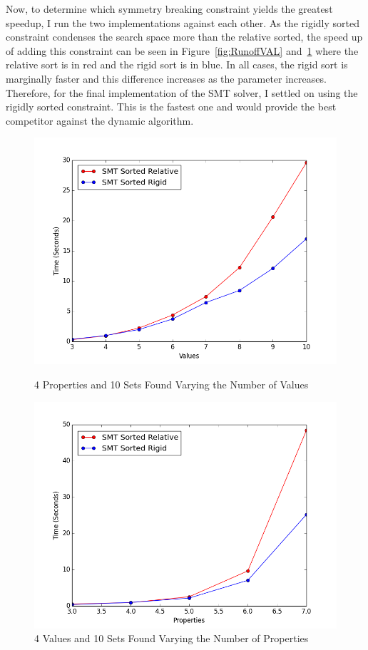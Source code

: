 \documentclass[pageno]{jpaper}
\begin{document}




Now, to determine which symmetry breaking constraint yields the greatest speedup, I run the two implementations against each other. As the rigidly sorted constraint condenses the search space more than the relative sorted, the speed up of adding this constraint can be seen in Figure~\ref{fig:RunoffVAL} and~\ref{fig:RunoffPROP} where the relative sort is in red and the rigid sort is in blue. In all cases, the rigid sort is marginally faster and this difference increases as the parameter increases. Therefore, for the final implementation of the SMT solver, I settled on using the rigidly sorted constraint. This is the fastest one and would provide the best competitor against the dynamic algorithm.



\begin{figure}[htbb]
\begin{minipage}[b]{0.5\linewidth}
\centering
\includegraphics[width=.75\linewidth]{RunoffSMTVAL-v345678910p4n10.png}
\caption{4 Properties and 10 Sets Found Varying the Number of Values}
\label{fig:RunoffVAL}
\end{minipage}
\hspace{0.5cm}
\begin{minipage}[b]{0.5\linewidth}
\centering
\includegraphics[width=.75\linewidth]{RunoffSMTPROP-v4p34567n10.png}
\caption{4 Values and 10 Sets Found Varying the Number of Properties}
\label{fig:RunoffPROP}
\end{minipage}
\end{figure}
\end{document}
